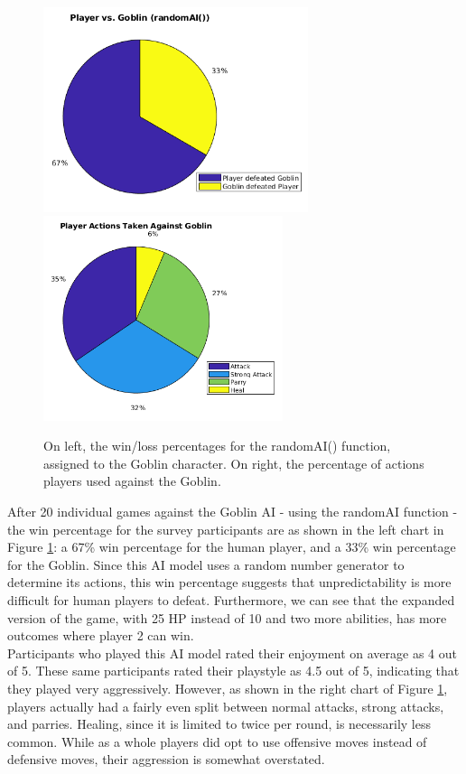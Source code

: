 \begin{figure}[H]
  \centering
  \includegraphics[width=7.75cm]{figures/goblinWins.png}
  \includegraphics[width=7cm]{figures/actionsGoblin.png}
  \caption{On left, the win/loss percentages for the randomAI() function, assigned to the Goblin character. On right, the percentage of actions players used against the Goblin.}
  \label{fig:pieGoblin}
\end{figure}
After 20 individual games against the Goblin AI - using the randomAI function - the win percentage for the survey participants are as shown in the left chart in Figure \ref{fig:pieGoblin}: a 67\% win percentage for the human player, and a 33\% win percentage for the Goblin. Since this AI model uses a random number generator to determine its actions, this win percentage suggests that unpredictability is more difficult for human players to defeat. Furthermore, we can see that the expanded version of the game, with 25 HP instead of 10 and two more abilities, has more outcomes where player 2 can win.\\

Participants who played this AI model rated their enjoyment on average as 4 out of 5. These same participants rated their playstyle as 4.5 out of 5, indicating that they played very aggressively. However, as shown in the right chart of Figure \ref{fig:pieGoblin}, players actually had a fairly even split between normal attacks, strong attacks, and parries. Healing, since it is limited to twice per round, is necessarily less common. While as a whole players did opt to use offensive moves instead of defensive moves, their aggression is somewhat overstated.

